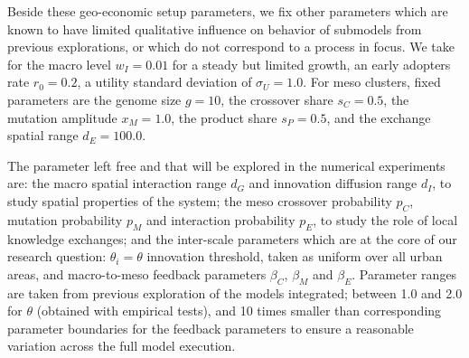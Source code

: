 \documentclass[letterpaper]{article}
\begin{document}
Beside these geo-economic setup parameters, we fix other parameters which are known to have limited qualitative influence on behavior of submodels from previous explorations, or which do not correspond to a process in focus. We take for the macro level $w_I = 0.01$ for a steady but limited growth, an early adopters rate $r_0=0.2$, a utility standard deviation of $\sigma_U = 1.0$. For meso clusters, fixed parameters are the genome size $g=10$, the crossover share $s_C=0.5$, the mutation amplitude $x_M=1.0$, the product share $s_P=0.5$, and the exchange spatial range $d_E = 100.0$.

The parameter left free and that will be explored in the numerical experiments are: the macro spatial interaction range $d_G$ and innovation diffusion range $d_I$, to study spatial properties of the system; the meso crossover probability $p_C$, mutation probability $p_M$ and interaction probability $p_E$, to study the role of local knowledge exchanges; and the inter-scale parameters which are at the core of our research question: $\theta_i = \theta$ innovation threshold, taken as uniform over all urban areas, and macro-to-meso feedback parameters $\beta_C$, $\beta_M$ and $\beta_E$. Parameter ranges are taken from previous exploration of the models integrated; between 1.0 and 2.0 for $\theta$ (obtained with empirical tests), and 10 times smaller than corresponding parameter boundaries for the feedback parameters to ensure a reasonable variation across the full model execution.
\end{document}
